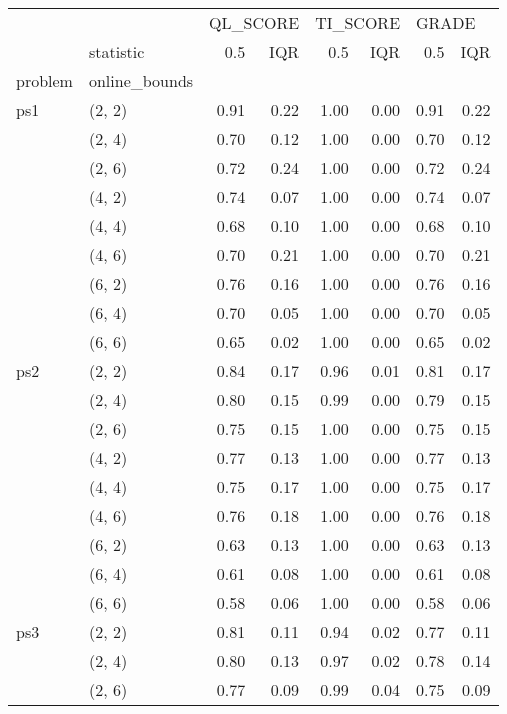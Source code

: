 \begin{tabular}{llrrrrrr}
\toprule
    & {} & \multicolumn{2}{l}{QL\_SCORE} & \multicolumn{2}{l}{TI\_SCORE} & \multicolumn{2}{l}{GRADE} \\
    & statistic &      0.5 &  IQR &      0.5 &  IQR &   0.5 &  IQR \\
problem & online\_bounds &          &      &          &      &       &      \\
\midrule
ps1 & (2, 2) &     0.91 & 0.22 &     1.00 & 0.00 &  0.91 & 0.22 \\
    & (2, 4) &     0.70 & 0.12 &     1.00 & 0.00 &  0.70 & 0.12 \\
    & (2, 6) &     0.72 & 0.24 &     1.00 & 0.00 &  0.72 & 0.24 \\
    & (4, 2) &     0.74 & 0.07 &     1.00 & 0.00 &  0.74 & 0.07 \\
    & (4, 4) &     0.68 & 0.10 &     1.00 & 0.00 &  0.68 & 0.10 \\
    & (4, 6) &     0.70 & 0.21 &     1.00 & 0.00 &  0.70 & 0.21 \\
    & (6, 2) &     0.76 & 0.16 &     1.00 & 0.00 &  0.76 & 0.16 \\
    & (6, 4) &     0.70 & 0.05 &     1.00 & 0.00 &  0.70 & 0.05 \\
    & (6, 6) &     0.65 & 0.02 &     1.00 & 0.00 &  0.65 & 0.02 \\
ps2 & (2, 2) &     0.84 & 0.17 &     0.96 & 0.01 &  0.81 & 0.17 \\
    & (2, 4) &     0.80 & 0.15 &     0.99 & 0.00 &  0.79 & 0.15 \\
    & (2, 6) &     0.75 & 0.15 &     1.00 & 0.00 &  0.75 & 0.15 \\
    & (4, 2) &     0.77 & 0.13 &     1.00 & 0.00 &  0.77 & 0.13 \\
    & (4, 4) &     0.75 & 0.17 &     1.00 & 0.00 &  0.75 & 0.17 \\
    & (4, 6) &     0.76 & 0.18 &     1.00 & 0.00 &  0.76 & 0.18 \\
    & (6, 2) &     0.63 & 0.13 &     1.00 & 0.00 &  0.63 & 0.13 \\
    & (6, 4) &     0.61 & 0.08 &     1.00 & 0.00 &  0.61 & 0.08 \\
    & (6, 6) &     0.58 & 0.06 &     1.00 & 0.00 &  0.58 & 0.06 \\
ps3 & (2, 2) &     0.81 & 0.11 &     0.94 & 0.02 &  0.77 & 0.11 \\
    & (2, 4) &     0.80 & 0.13 &     0.97 & 0.02 &  0.78 & 0.14 \\
    & (2, 6) &     0.77 & 0.09 &     0.99 & 0.04 &  0.75 & 0.09 \\

\end{tabular}
